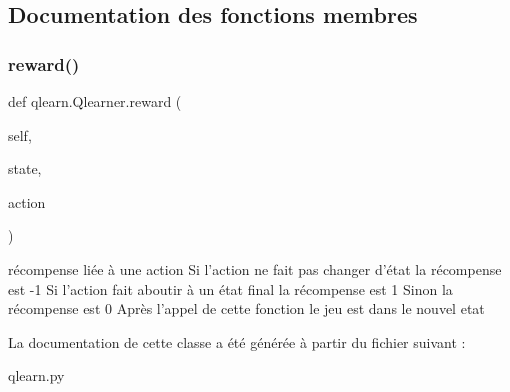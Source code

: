 \subsection{Documentation des fonctions membres}
\mbox{\label{classqlearn_1_1Qlearner_aa5d2c9fb82ed55754cab3f485551ba22}} 
\subsubsection{\texorpdfstring{reward()}{reward()}}
{\footnotesize\ttfamily def qlearn.\+Qlearner.\+reward (\begin{DoxyParamCaption}\item[{}]{self,  }\item[{}]{state,  }\item[{}]{action }\end{DoxyParamCaption})}

\begin{DoxyVerb}    récompense liée à une action
    Si l'action ne fait pas changer d'état la récompense est -1
    Si l'action fait aboutir à un état final la récompense est 1
    Sinon la récompense est 0
    Après l'appel de cette fonction le jeu est dans le nouvel etat 
\end{DoxyVerb}
 

La documentation de cette classe a été générée à partir du fichier suivant \+:\begin{DoxyCompactItemize}
\item 
qlearn.\+py\end{DoxyCompactItemize}
